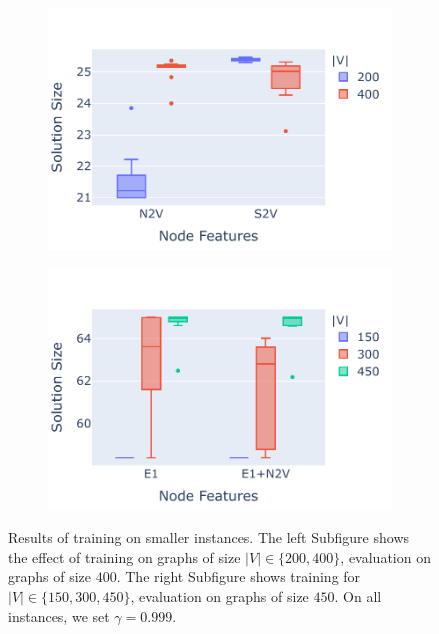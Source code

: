 \documentclass[draft,final]{vutinfth} %
\begin{document}
\begin{figure}
    \centering
    \begin{subfigure}{0.49\textwidth}
        \centering
        \includegraphics[width=\textwidth]{graphics/generalization-1.pdf}
    \end{subfigure}
    \begin{subfigure}{0.49\textwidth}
        \centering
        \includegraphics[width=\textwidth]{graphics/generalization-2.pdf}
    \end{subfigure}
    \caption{Results of training on smaller instances. The left Subfigure shows the effect of training on graphs of size $|V| \in \{200, 400\}$, evaluation on graphs of size $400$. The right Subfigure shows training for $|V| \in \{150, 300, 450\}$, evaluation on graphs of size $450$. On all instances, we set $\gamma=0.999$.}
    \label{fig:generalization}
\end{figure}
\end{document}
